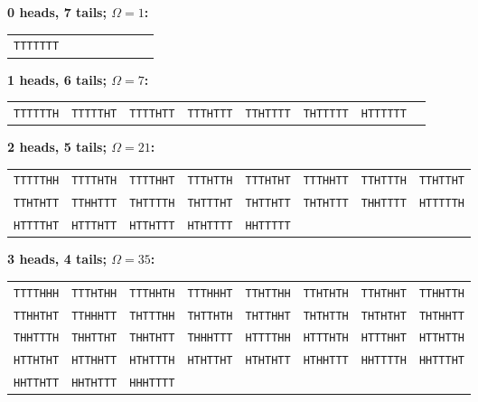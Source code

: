 \noindent\textbf{0 heads, 7 tails; $\Omega=1$:}\par\smallskip
\begin{tabular}{@{}llllllll@{}}
\texttt{TTTTTTT} \\
\end{tabular}\par\medskip
\noindent\textbf{1 heads, 6 tails; $\Omega=7$:}\par\smallskip
\begin{tabular}{@{}llllllll@{}}
\texttt{TTTTTTH} & \texttt{TTTTTHT} & \texttt{TTTTHTT} & \texttt{TTTHTTT} & \texttt{TTHTTTT} & \texttt{THTTTTT} & \texttt{HTTTTTT} \\
\end{tabular}\par\medskip
\noindent\textbf{2 heads, 5 tails; $\Omega=21$:}\par\smallskip
\begin{tabular}{@{}llllllll@{}}
\texttt{TTTTTHH} & \texttt{TTTTHTH} & \texttt{TTTTHHT} & \texttt{TTTHTTH} & \texttt{TTTHTHT} & \texttt{TTTHHTT} & \texttt{TTHTTTH} & \texttt{TTHTTHT} \\
\texttt{TTHTHTT} & \texttt{TTHHTTT} & \texttt{THTTTTH} & \texttt{THTTTHT} & \texttt{THTTHTT} & \texttt{THTHTTT} & \texttt{THHTTTT} & \texttt{HTTTTTH} \\
\texttt{HTTTTHT} & \texttt{HTTTHTT} & \texttt{HTTHTTT} & \texttt{HTHTTTT} & \texttt{HHTTTTT} \\
\end{tabular}\par\medskip
\noindent\textbf{3 heads, 4 tails; $\Omega=35$:}\par\smallskip
\begin{tabular}{@{}llllllll@{}}
\texttt{TTTTHHH} & \texttt{TTTHTHH} & \texttt{TTTHHTH} & \texttt{TTTHHHT} & \texttt{TTHTTHH} & \texttt{TTHTHTH} & \texttt{TTHTHHT} & \texttt{TTHHTTH} \\
\texttt{TTHHTHT} & \texttt{TTHHHTT} & \texttt{THTTTHH} & \texttt{THTTHTH} & \texttt{THTTHHT} & \texttt{THTHTTH} & \texttt{THTHTHT} & \texttt{THTHHTT} \\
\texttt{THHTTTH} & \texttt{THHTTHT} & \texttt{THHTHTT} & \texttt{THHHTTT} & \texttt{HTTTTHH} & \texttt{HTTTHTH} & \texttt{HTTTHHT} & \texttt{HTTHTTH} \\
\texttt{HTTHTHT} & \texttt{HTTHHTT} & \texttt{HTHTTTH} & \texttt{HTHTTHT} & \texttt{HTHTHTT} & \texttt{HTHHTTT} & \texttt{HHTTTTH} & \texttt{HHTTTHT} \\
\texttt{HHTTHTT} & \texttt{HHTHTTT} & \texttt{HHHTTTT} \\
\end{tabular}\par\medskip
